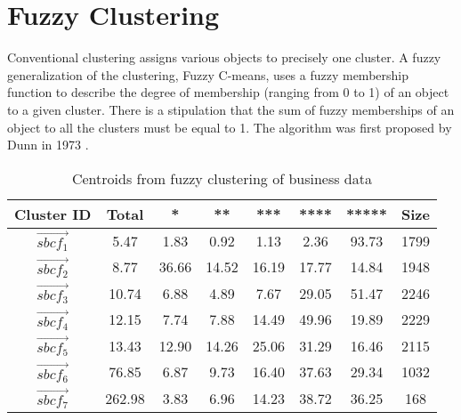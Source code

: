 \documentclass[oribibl]{llncs}
\begin{document}
\section{Fuzzy Clustering}

Conventional clustering assigns various objects to precisely one
cluster. A fuzzy generalization of the clustering, Fuzzy C-means,
uses a fuzzy membership
function to describe the degree of membership (ranging from 0 to 1) of an
object to a given cluster. There is a stipulation that the sum of fuzzy
memberships of an object to all the clusters must be equal to 1.
The algorithm was first proposed by Dunn in 1973 \cite{Dunn1973}.

\begin{table*}[h]
	\caption{Centroids from fuzzy clustering of business data }
\centering
\small
{\setlength{\tabcolsep}{0.1cm}
\begin{tabular}{|c|c|c|c|c|c|c|c|}
\hline
 Cluster ID&Total  & *&**&***&****&*****&Size\\
  \hline
$\vec{sbcf_1}$&5.47&1.83&0.92&1.13&2.36&93.73&1799\\
\hline
$\vec{sbcf_2}$&8.77&36.66&14.52&16.19&17.77&14.84&1948\\
\hline
$\vec{sbcf_3}$&10.74&6.88&4.89&7.67&29.05&51.47&2246\\
\hline
$\vec{sbcf_4}$&12.15&7.74&7.88&14.49&49.96&19.89&2229\\
\hline
$\vec{sbcf_5}$&13.43&12.90&14.26&25.06&31.29&16.46&2115\\
\hline
$\vec{sbcf_6}$&76.85&6.87&9.73&16.40&37.63&29.34&1032\\
\hline
$\vec{sbcf_7}$&262.98&3.83&6.96&14.23&38.72&36.25&168\\
\hline
\end{tabular}}
\label{tab:fuzzyBusinessStaticCentroids} 
\end{table*}
\end{document}
